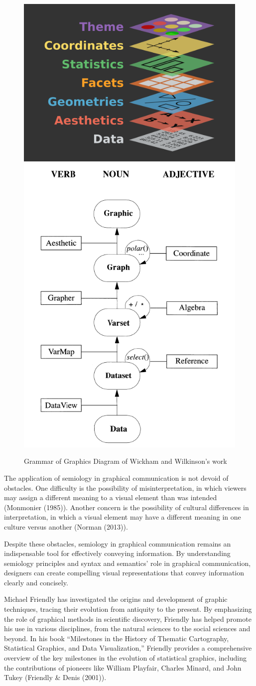 \documentclass[print]{nuthesis}
\begin{document}
\begin{figure}

{\centering \includegraphics[width=0.45\linewidth]{figure/gglayers} \includegraphics[width=0.45\linewidth]{figure/graphic-flowchart} 

}

\caption{Grammar of Graphics Diagram of Wickham and Wilkinson's work}\label{fig:graphics2}
\end{figure}

The application of semiology in graphical communication is not devoid of obstacles.
One difficulty is the possibility of misinterpretation, in which viewers may assign a different meaning to a visual element than was intended (Monmonier (1985)).
Another concern is the possibility of cultural differences in interpretation, in which a visual element may have a different meaning in one culture versus another (Norman (2013)).

Despite these obstacles, semiology in graphical communication remains an indispensable tool for effectively conveying information.
By understanding semiology principles and syntax and semantics' role in graphical communication, designers can create compelling visual representations that convey information clearly and concisely.

Michael Friendly has investigated the origins and development of graphic techniques, tracing their evolution from antiquity to the present.
By emphasizing the role of graphical methods in scientific discovery, Friendly has helped promote his use in various disciplines, from the natural sciences to the social sciences and beyond.
In his book ``Milestones in the History of Thematic Cartography, Statistical Graphics, and Data Visualization,'' Friendly provides a comprehensive overview of the key milestones in the evolution of statistical graphics, including the contributions of pioneers like William Playfair, Charles Minard, and John Tukey (Friendly \& Denis (2001)).
\end{document}
